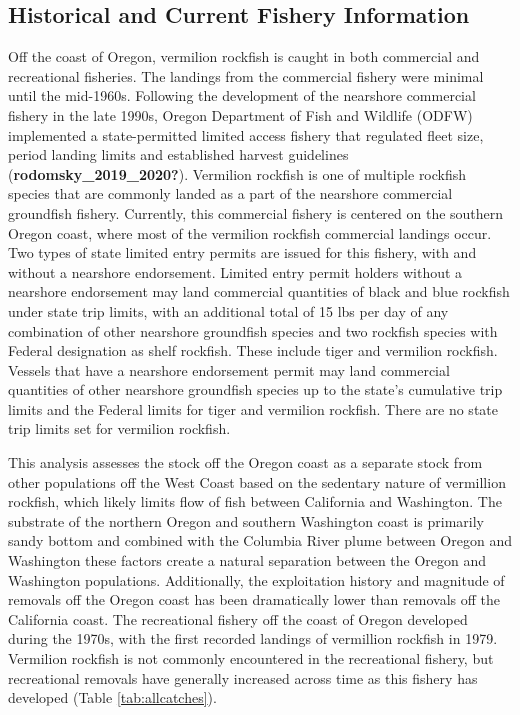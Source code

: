 \documentclass[11pt,
  english,
  a4paper,
]{article}
\begin{document}
\hypertarget{historical-and-current-fishery-information}{%
\subsection{Historical and Current Fishery Information}\label{historical-and-current-fishery-information}}

\leavevmode\tagmcend\tagstructend


Off the coast of Oregon, vermilion rockfish is caught in both commercial and recreational fisheries. The landings from the commercial fishery were minimal until the mid-1960s. Following the development of the nearshore commercial fishery in the late 1990s, Oregon Department of Fish and Wildlife (ODFW) implemented a state-permitted limited access fishery that regulated fleet size, period landing limits and established harvest guidelines {(\textbf{rodomsky\_2019\_2020?})\leavevmode\tagmcend\tagstructend}. Vermilion rockfish is one of multiple rockfish species that are commonly landed as a part of the nearshore commercial groundfish fishery. Currently, this commercial fishery is centered on the southern Oregon coast, where most of the vermilion rockfish commercial landings occur. Two types of state limited entry permits are issued for this fishery, with and without a nearshore endorsement. Limited entry permit holders without a nearshore endorsement may land commercial quantities of black and blue rockfish under state trip limits, with an additional total of 15 lbs per day of any combination of other nearshore groundfish species and two rockfish species with Federal designation as shelf rockfish. These include tiger and vermilion rockfish. Vessels that have a nearshore endorsement permit may land commercial quantities of other nearshore groundfish species up to the state's cumulative trip limits and the Federal limits for tiger and vermilion rockfish. There are no state trip limits set for vermilion rockfish.

\leavevmode\tagmcend\tagstructend\par


This analysis assesses the stock off the Oregon coast as a separate stock from other populations off the West Coast based on the sedentary nature of vermillion rockfish, which likely limits flow of fish between California and Washington. The substrate of the northern Oregon and southern Washington coast is primarily sandy bottom and combined with the Columbia River plume between Oregon and Washington these factors create a natural separation between the Oregon and Washington populations. Additionally, the exploitation history and magnitude of removals off the Oregon coast has been dramatically lower than removals off the California coast. The recreational fishery off the coast of Oregon developed during the 1970s, with the first recorded landings of vermillion rockfish in 1979. Vermilion rockfish is not commonly encountered in the recreational fishery, but recreational removals have generally increased across time as this fishery has developed (Table \ref{tab:allcatches}).
\end{document}
